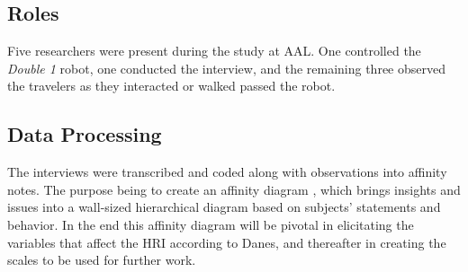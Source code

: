 \subsection{Roles}
Five researchers were present during the study at AAL. One controlled the \textit{Double 1} robot, one conducted the interview, and the remaining three observed the travelers as they interacted or walked passed the robot. 

\subsection{Data Processing}
The interviews were transcribed and coded along with observations into affinity notes. The purpose being to create an affinity diagram \cite{Wendell2005}, which brings insights and issues into a wall-sized hierarchical diagram based on subjects' statements and behavior. In the end this affinity diagram will be pivotal in elicitating the variables that affect the HRI according to Danes, and thereafter in creating the scales to be used for further work.




